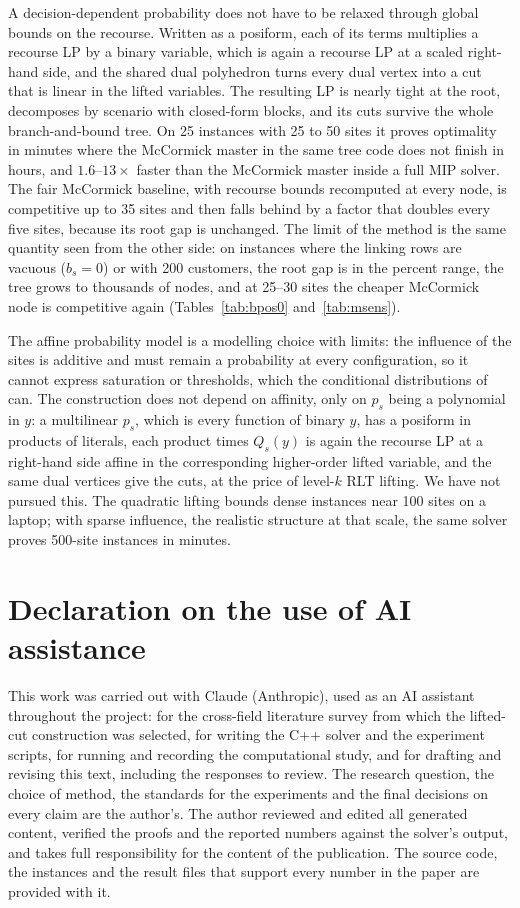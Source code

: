 \documentclass[11pt]{article}
\begin{document}
A decision-dependent probability does not have to be relaxed through global bounds on the recourse. Written as a
posiform, each of its terms multiplies a recourse LP by a binary variable, which is again a recourse LP at a scaled
right-hand side, and the shared dual polyhedron turns every dual vertex into a cut that is linear in the lifted
variables. The resulting LP is nearly tight at the root, decomposes by scenario with closed-form blocks, and its cuts
survive the whole branch-and-bound tree. On 25 instances with 25 to 50 sites it proves optimality in minutes
where the McCormick master in the same tree code does not finish in hours, and $1.6$--$13\times$ faster than the
McCormick master inside a full MIP solver. The fair McCormick
baseline, with recourse bounds recomputed at every node, is competitive up to 35 sites and then falls behind by a
factor that doubles every five sites, because its root gap is unchanged. The limit of the method is the same quantity
seen from the other side: on instances where the linking rows are vacuous ($b_s = 0$) or with 200 customers, the root
gap is in the percent range, the tree grows to thousands of nodes, and at 25--30 sites the cheaper McCormick node is
competitive again (Tables~\ref{tab:bpos0} and~\ref{tab:msens}).

The affine probability model is a modelling choice with limits: the influence of the sites is additive and must
remain a probability at every configuration, so it cannot express saturation or thresholds, which the conditional
distributions of \cite{fl2025} can. The construction does not depend on affinity, only on $p_s$ being a polynomial
in $y$: a multilinear $p_s$, which is every function of binary $y$, has a posiform in products of literals, each
product times $Q_s(y)$ is again the recourse LP at a right-hand side affine in the corresponding higher-order lifted
variable, and the same dual vertices give the cuts, at the price of level-$k$ RLT lifting. We have not pursued this.
The quadratic lifting bounds dense instances
near 100 sites on a laptop; with sparse influence, the realistic structure at that scale, the same solver proves
500-site instances in minutes.

\section*{Declaration on the use of AI assistance}

This work was carried out with Claude (Anthropic), used as an AI assistant throughout the project: for the
cross-field literature survey from which the lifted-cut construction was selected, for writing the C++ solver and
the experiment scripts, for running and recording the computational study, and for drafting and revising this
text, including the responses to review. The research question, the choice of method, the standards for the
experiments and the final decisions on every claim are the author's. The author reviewed and edited all generated
content, verified the proofs and the reported numbers against the solver's output, and takes full responsibility for
the content of the publication. The source code, the instances and the result files that support every number in
the paper are provided with it.
\end{document}
